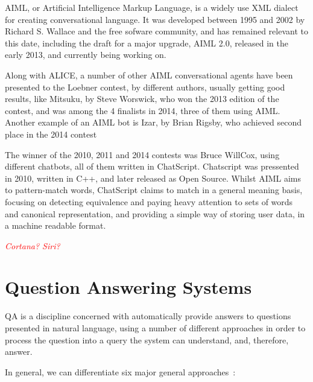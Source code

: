AIML, or Artificial Intelligence Markup Language, is a widely use XML dialect for creating conversational language. It was developed between 1995 and 2002 by Richard S. Wallace and the free sofware community, and has remained relevant to this date, including the draft for a major upgrade, AIML 2.0, released in the early 2013, and currently being working on.

Along with ALICE, a number of other AIML conversational agents have been presented to the Loebner contest, by different authors, usually getting good results, like Mitsuku, by Steve Worswick, who won the 2013 edition of the contest, and was among the 4 finalists in 2014, three of them using AIML. Another example of an AIML bot is Izar, by Brian Rigsby, who achieved second place in the 2014 contest

The winner of the 2010, 2011 and 2014 contests was Bruce WillCox, using different chatbots, all of them written in ChatScript. Chatscript was pressented in 2010, written in C++, and later released as Open Source. Whilst AIML aims to pattern-match words, ChatScript claims to match in a general meaning basis, focusing on detecting equivalence and paying heavy attention to sets of words and canonical representation, and providing a simple way of storing user data, in a machine readable format.

\emph{\textcolor{red}{Cortana? Siri?}}

\section{Question Answering Systems}
\label{sec:qa_sys}

\ac{QA} is a discipline concerned with automatically provide answers to questions presented in natural language, using a number of different approaches in order to process the question into a query the system can understand, and, therefore, answer.

In general, we can differentiate six major general approaches~\cite{unger2014an}:

